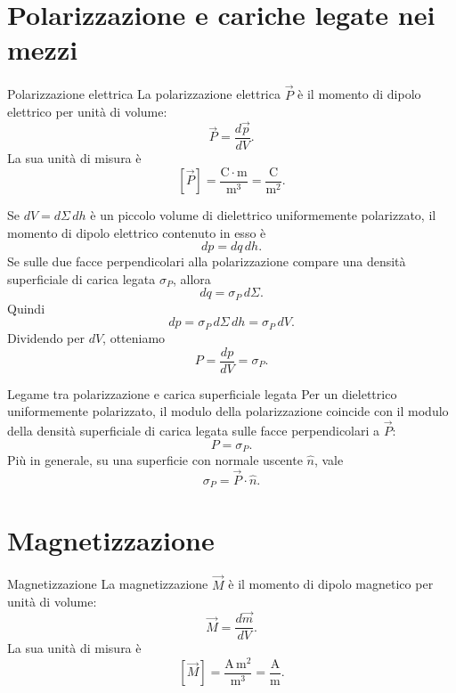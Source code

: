 \documentclass[a4paper]{article}
\begin{document}
\section{Polarizzazione e cariche legate nei mezzi}

\begin{snippetdefinition}{Polarizzazione elettrica}
La polarizzazione elettrica \(\vec{P}\) è il momento di dipolo elettrico per unità di volume:
\[
    \vec{P}=\frac{d\vec{p}}{dV}.
\]
La sua unità di misura è
\[
    [\vec{P}]=\frac{\mathrm{C}\cdot\mathrm{m}}{\mathrm{m}^3}=\frac{\mathrm{C}}{\mathrm{m}^2}.
\]
\end{snippetdefinition}

Se \(dV=d\Sigma\,dh\) è un piccolo volume di dielettrico uniformemente polarizzato, il momento di dipolo elettrico contenuto in esso è
\[
dp=dq\,dh.
\]
Se sulle due facce perpendicolari alla polarizzazione compare una densità superficiale di carica legata \(\sigma_P\), allora
\[
dq=\sigma_P\,d\Sigma.
\]
Quindi
\[
dp=\sigma_P\,d\Sigma\,dh=\sigma_P\,dV.
\]
Dividendo per \(dV\), otteniamo
\[
P=\frac{dp}{dV}=\sigma_P.
\]

\begin{snippetproposition}{Legame tra polarizzazione e carica superficiale legata}
Per un dielettrico uniformemente polarizzato, il modulo della polarizzazione coincide con il modulo della densità superficiale di carica legata sulle facce perpendicolari a \(\vec{P}\):
\[
    P=\sigma_P.
\]
Più in generale, su una superficie con normale uscente \(\hat{n}\), vale
\[
    \sigma_P=\vec{P}\cdot\hat{n}.
\]
\end{snippetproposition}

\section{Magnetizzazione}

\begin{snippetdefinition}{Magnetizzazione}
La magnetizzazione \(\vec{M}\) è il momento di dipolo magnetico per unità di volume:
\[
    \vec{M}=\frac{d\vec{m}}{dV}.
\]
La sua unità di misura è
\[
    [\vec{M}]=\frac{\mathrm{A}\,\mathrm{m}^2}{\mathrm{m}^3}=\frac{\mathrm{A}}{\mathrm{m}}.
\]
\end{snippetdefinition}

\begin{center}
\end{center}
\end{document}
